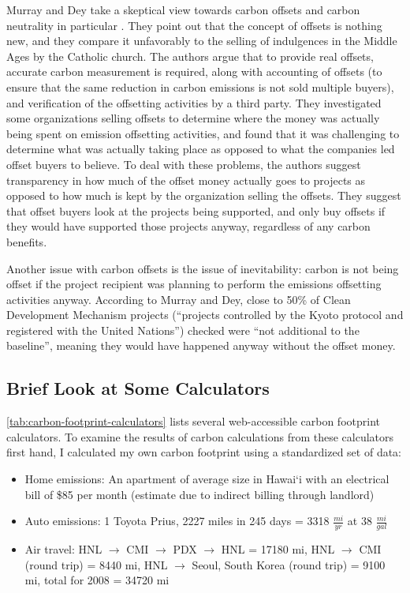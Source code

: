 Murray and Dey take a skeptical view towards carbon offsets and carbon neutrality in particular \cite{Murray2007Carbon-neutral}. They point out that the concept of offsets is nothing new, and they compare it unfavorably to the selling of indulgences in the Middle Ages by the Catholic church. The authors argue that to provide real offsets, accurate carbon measurement is required, along with accounting of offsets (to ensure that the same reduction in carbon emissions is not sold multiple buyers), and verification of the offsetting activities by a third party. They investigated some organizations selling offsets to determine where the money was actually being spent on emission offsetting activities, and found that it was challenging to determine what was actually taking place as opposed to what the companies led offset buyers to believe. To deal with these problems, the authors suggest transparency in how much of the offset money actually goes to projects as opposed to how much is kept by the organization selling the offsets. They suggest that offset buyers look at the projects being supported, and only buy offsets if they would have supported those projects anyway, regardless of any carbon benefits.

Another issue with carbon offsets is the issue of inevitability: carbon is not being offset if the project recipient was planning to perform the emissions offsetting activities anyway. According to Murray and Dey, close to 50\% of Clean Development Mechanism projects (``projects controlled by the Kyoto protocol and registered with the United Nations'') checked were ``not additional to the baseline'', meaning they would have happened anyway without the offset money.

\subsection{Brief Look at Some Calculators}

\autoref{tab:carbon-footprint-calculators} lists several web-accessible carbon footprint calculators. To examine the results of carbon calculations from these calculators first hand, I calculated my own carbon footprint using a standardized set of data:
\begin{itemize}
	\item Home emissions: An apartment of average size in Hawai`i with an electrical bill of \$85 per month (estimate due to indirect billing through landlord)
	\item Auto emissions: 1 Toyota Prius, 2227 miles in 245 days = 3318 $\frac{mi}{yr}$ at 38 $\frac{mi}{gal}$
	\item Air travel: HNL $\rightarrow$ CMI $\rightarrow$ PDX $\rightarrow$ HNL = 17180 mi, HNL $\rightarrow$ CMI (round trip) = 8440 mi, HNL $\rightarrow$ Seoul, South Korea (round trip) = 9100 mi, total for 2008 = 34720 mi
\end{itemize}

